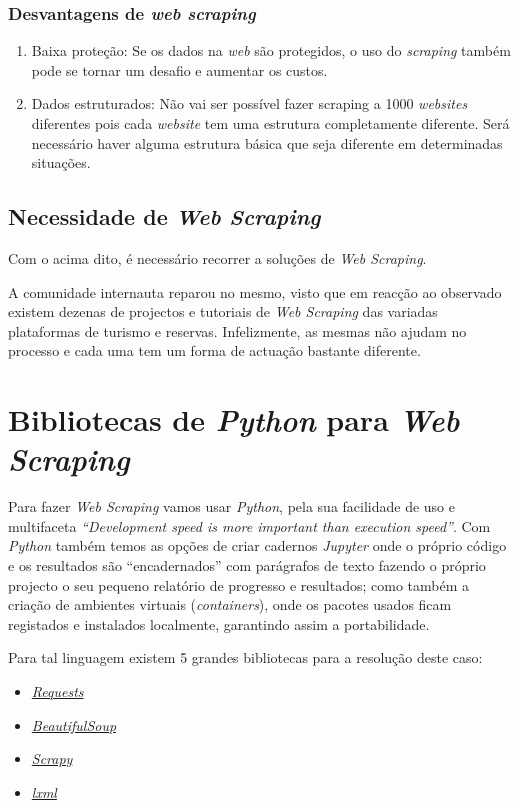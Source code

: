 \subsubsection{Desvantagens de \textit{web scraping}}

\begin{enumerate}
  \setlength\itemsep{0.05em}
  \item Baixa proteção: Se os dados na \textit{web} são protegidos, o uso do \textit{scraping} também pode se tornar um desafio e aumentar os custos.
  \item Dados estruturados: Não vai ser possível fazer scraping a 1000 \textit{websites} diferentes pois cada \textit{website} tem uma estrutura completamente diferente. Será necessário haver alguma estrutura básica que seja diferente em determinadas situações.
\end{enumerate}

\subsection{Necessidade de \textit{Web Scraping}}

Com o acima dito, é necessário recorrer a soluções de \textit{Web Scraping}.

A comunidade internauta reparou no mesmo, visto que em reacção ao observado existem dezenas de projectos e tutoriais de \textit{Web Scraping} das variadas plataformas de turismo e reservas.
Infelizmente, as mesmas não ajudam no processo e cada uma tem um forma de actuação bastante diferente.

\section{Bibliotecas de \textit{Python} para \textit{Web Scraping}}

Para fazer \textit{Web Scraping} vamos usar \textit{Python}, pela sua facilidade de uso e multifaceta \textit{``Development speed is more important than execution speed''}.
Com \textit{Python} também temos as opções de criar cadernos \textit{Jupyter} onde o próprio código e os resultados são ``encadernados'' com parágrafos de texto fazendo o próprio projecto o seu pequeno relatório de progresso e resultados; como também a criação de ambientes virtuais (\textit{containers}), onde os pacotes usados ficam registados e instalados localmente, garantindo assim a portabilidade.

Para tal linguagem existem 5 grandes bibliotecas para a resolução deste caso:
\begin{itemize}
  \setlength\itemsep{0.05em}
  \item \textit{\href{https://pypi.org/project/requests/}{Requests}}
  \item \textit{\href{https://pypi.org/project/BeautifulSoup/}{BeautifulSoup}}
  \item \textit{\href{https://pypi.org/project/Scrapy3/}{Scrapy}}
  \item \textit{\href{https://pypi.org/project/lxml/}{lxml}}
\end{itemize}


